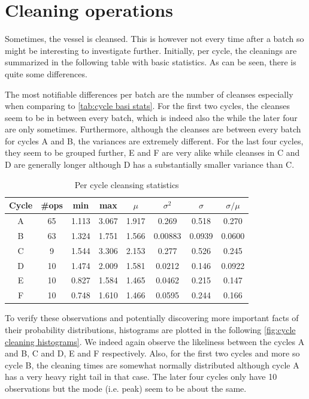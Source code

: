 \documentclass[../Thesis.tex]{subfiles}
\begin{document}


\newpage
\section{Cleaning operations}
Sometimes, the vessel is cleansed. This is however not every time after a batch so might be interesting to investigate further. Initially, per cycle, the cleanings are summarized in the following table with basic statistics. As can be seen, there is quite some differences.

The most notifiable differences per batch are the number of cleanses especially when comparing to \autoref{tab:cycle basi stats}. For the first two cycles, the cleanses seem to be in between every batch, which is indeed also the while the later four are only sometimes. Furthermore, although the cleanses are between every batch for cycles A and B, the variances are extremely different. For the last four cycles, they seem to be grouped further, E and F are very alike while cleanses in C and D are generally longer although D has a substantially smaller variance than C.

\begin{table}[h]
    \centering
    \begin{tabular}{c|c|c|c|c|c|c|c}
        Cycle & \#ops & min   & max   & $\mu$ & $\sigma^2$ & $\sigma$ & $\sigma / \mu$ \\ \hline
        A     & 65    & 1.113 & 3.067 & 1.917 & 0.269      & 0.518    & 0.270          \\
        B     & 63    & 1.324 & 1.751 & 1.566 & 0.00883    & 0.0939   & 0.0600         \\
        C     & 9     & 1.544 & 3.306 & 2.153 & 0.277      & 0.526    & 0.245          \\
        D     & 10    & 1.474 & 2.009 & 1.581 & 0.0212     & 0.146    & 0.0922         \\
        E     & 10    & 0.827 & 1.584 & 1.465 & 0.0462     & 0.215    & 0.147          \\
        F     & 10    & 0.748 & 1.610 & 1.466 & 0.0595     & 0.244    & 0.166
    \end{tabular}
    \caption{Per cycle cleansing statistics}
    \label{tab:cycle cleansing stats stats}
\end{table}

To verify these observations and potentially discovering more important facts of their probability distributions, histograms are plotted in the following \autoref{fig:cycle cleaning histograms}. We indeed again observe the likeliness between the cycles A and B, C and D, E and F respectively. Also, for the first two cycles and more so cycle B, the cleaning times are somewhat normally distributed although cycle A has a very heavy right tail in that case. The later four cycles only have 10 observations but the mode (i.e. peak) seem to be about the same.
\end{document}
